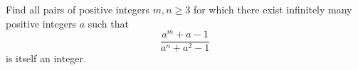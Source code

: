 Find all pairs of positive integers
$m, n \ge 3$ for which there exist infinitely many
positive integers $a$ such that
\[ \frac{a^m+a-1}{a^n+a^2-1} \]
is itself an integer.